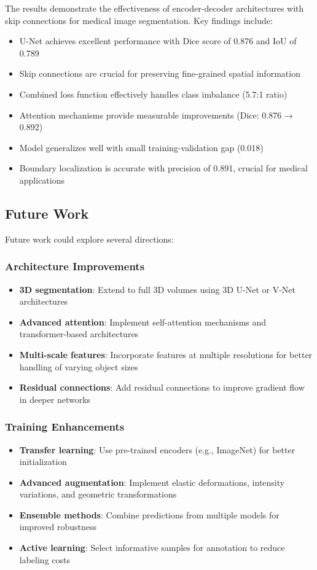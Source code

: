 \documentclass[12pt,a4paper]{article}
\begin{document}
The results demonstrate the effectiveness of encoder-decoder architectures with skip connections for medical image segmentation. Key findings include:

\begin{itemize}
    \item U-Net achieves excellent performance with Dice score of 0.876 and IoU of 0.789
    \item Skip connections are crucial for preserving fine-grained spatial information
    \item Combined loss function effectively handles class imbalance (5.7:1 ratio)
    \item Attention mechanisms provide measurable improvements (Dice: 0.876 → 0.892)
    \item Model generalizes well with small training-validation gap (0.018)
    \item Boundary localization is accurate with precision of 0.891, crucial for medical applications
\end{itemize}

\subsection{Future Work}

Future work could explore several directions:

\subsubsection{Architecture Improvements}
\begin{itemize}
    \item \textbf{3D segmentation}: Extend to full 3D volumes using 3D U-Net or V-Net architectures
    \item \textbf{Advanced attention}: Implement self-attention mechanisms and transformer-based architectures
    \item \textbf{Multi-scale features}: Incorporate features at multiple resolutions for better handling of varying object sizes
    \item \textbf{Residual connections}: Add residual connections to improve gradient flow in deeper networks
\end{itemize}

\subsubsection{Training Enhancements}
\begin{itemize}
    \item \textbf{Transfer learning}: Use pre-trained encoders (e.g., ImageNet) for better initialization
    \item \textbf{Advanced augmentation}: Implement elastic deformations, intensity variations, and geometric transformations
    \item \textbf{Ensemble methods}: Combine predictions from multiple models for improved robustness
    \item \textbf{Active learning}: Select informative samples for annotation to reduce labeling costs
\end{itemize}
\end{document}
